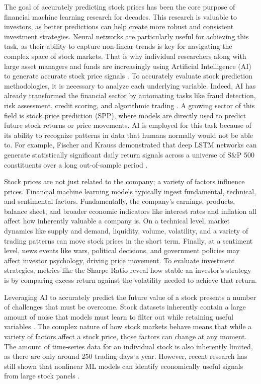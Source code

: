 \documentclass[11pt,twocolumn]{article}
\begin{document}
The goal of accurately predicting stock prices has been the core purpose
of financial machine learning research for decades. This research is
valuable to investors, as better predictions can help create more robust
and consistent investment strategies. Neural networks are particularly
useful for achieving this task, as their ability to capture non-linear
trends is key for navigating the complex space of stock markets. That is
why individual researchers along with large asset managers and funds are
increasingly using Artificial Intelligence (AI) to generate accurate
stock price signals \cite{fischer2018,gkx2020}. To accurately evaluate
stock prediction methodologies, it is necessary to analyze each
underlying variable. Indeed, AI has already transformed the financial
sector by automating tasks like fraud detection, risk assessment, credit
scoring, and algorithmic trading \cite{lopez2018}. A growing sector of
this field is stock price prediction (SPP), where models are directly
used to predict future stock returns or price movements. AI is employed
for this task because of its ability to recognize patterns in data that
humans normally would not be able to. For example, Fischer and Krauss
demonstrated that deep LSTM networks can generate statistically
significant daily return signals across a universe of S\&P 500
constituents over a long out-of-sample period \cite{fischer2018}.

Stock prices are not just related to the company; a variety of factors
influence prices. Financial machine learning models typically ingest
fundamental, technical, and sentimental factors. Fundamentally, the
company's earnings, products, balance sheet, and broader economic
indicators like interest rates and inflation all affect how inherently
valuable a company is. On a technical level, market dynamics like supply
and demand, liquidity, volume, volatility, and a variety of trading
patterns can move stock prices in the short term. Finally, at a sentiment
level, news events like wars, political decisions, and government
policies may affect investor psychology, driving price movement. To
evaluate investment strategies, metrics like the Sharpe Ratio reveal how
stable an investor's strategy is by comparing excess return against the
volatility needed to achieve that return.

Leveraging AI to accurately predict the future value of a stock presents
a number of challenges that must be overcome. Stock datasets inherently
contain a large amount of noise that models must learn to filter out
while retaining useful variables \cite{harvey2016}. The complex nature
of how stock markets behave means that while a variety of factors affect
a stock price, those factors can change at any moment. The amount of
time-series data for an individual stock is also inherently limited, as
there are only around 250 trading days a year. However, recent research
has still shown that nonlinear ML models can identify economically useful
signals from large stock panels \cite{fischer2018,gkx2020}.
\end{document}
